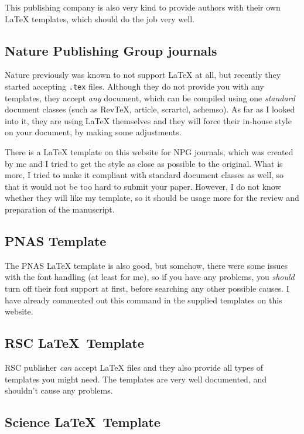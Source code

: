 This publishing company is also very kind to provide authors with their own
\LaTeX{} templates, which should do the job very well.

\subsection{Nature Publishing Group journals}

Nature previously was known to not support \LaTeX{} at all, but recently they
started accepting \verb|.tex| files.
%
Although they do not provide you with any templates, they accept \emph{any}
document, which can be compiled using one \emph{standard} document classes (such
as RevTeX, article, scrartcl, achemso).
%
As far as I looked into it, they are using \LaTeX{} themselves and they will
force their in-house style on your document, by making some adjustments.



There is a \LaTeX{} template on this website for NPG journals, which was created
by me and I tried to get the style as close as possible to the original.
%
What is more, I tried to make it compliant with standard document classes as
well, so that it would not be too hard to submit your paper.
%
However, I do not know whether they will like my template, so it should be usage
more for the review and preparation of the manuscript.

\subsection{PNAS Template}

The PNAS \LaTeX{} template is also good, but somehow, there were some issues
with the font handling (at least for me), so if you have any problems, you
\emph{should} turn off their font support at first, before searching any other
possible causes.
%
I have already commented out this command in the supplied templates on this
website.

\subsection{RSC \LaTeX\ Template}

RSC publisher \emph{can} accept \LaTeX{} files and they also provide all types
of templates you might need.
%
The templates are very well documented, and shouldn't cause any problems.

\subsection{Science \LaTeX\ Template}

